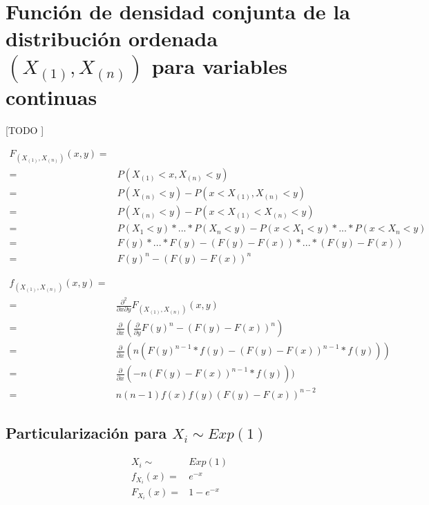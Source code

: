 \documentclass{article}
\begin{document}
  \section{Función de densidad conjunta de la distribución ordenada $(X_{(1)}, X_{(n)})$ para variables continuas}
  \label{sec:e2}

    \paragraph{}
    [TODO ]

    \begin{align}
      F_{(X_{(1)}, X_{(n)})} (x,y) =& \\
      =& P(X_{(1)} < x, X_{(n)} < y) \\
      =& P(X_{(n)} < y) - P(x < X_{(1)}, X_{(n)} < y) \\
      =& P(X_{(n)} < y) - P(x < X_{(1)} < X_{(n)} < y) \\
      =& P(X_{1} < y) * ... * P(X_{n} < y) - P(x < X_1 < y) * ... * P(x < X_n < y) \\
      =& F(y) * ... *F(y)  - (F(y)-F(x)) * ... * (F(y)-F(x)) \\
      =& F(y)^n - (F(y)-F(x))^n
    \end{align}

    \begin{align}
      f_{(X_{(1)}, X_{(n)})} (x,y) =& \\
      =& \frac{\partial^2}{\partial x \partial y}F_{(X_{(1)}, X_{(n)})} (x,y) \\
      =& \frac{\partial}{\partial x}( \frac{\partial}{\partial y} F(y)^n - (F(y)-F(x))^n) \\
      =& \frac{\partial}{\partial x}( n (F(y)^{n-1}*f(y) - (F(y)-F(x))^{n-1}*f(y))) \\
      =& \frac{\partial}{\partial x}( -n (F(y)-F(x))^{n-1}*f(y))) \\
      =& n(n-1)f(x)f(y)(F(y) - F(x))^{n-2}
    \end{align}

    \subsection{Particularización para $X_i \sim Exp(1)$}


      \begin{align}
        X_i \sim& Exp(1)\\
        f_{X_{i}}(x) =& e^{-x}\\
        F_{X_{i}}(x) =& 1-e^{-x} \\
      \end{align}
\end{document}
